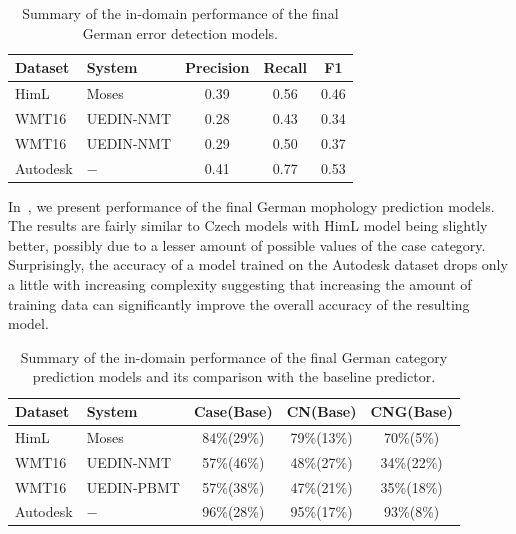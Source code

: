 \begin{table}[t]
\centering
\small

\begin{tabular}{ll|ccc}
Dataset  &  System  &  Precision  &  Recall  &  F1  \\
\hline
HimL  &  Moses  &  0.39  &  0.56  &  0.46  \\
WMT16 &  UEDIN-NMT  &  0.28  &  0.43  &  0.34  \\
WMT16 &  UEDIN-NMT  &  0.29  &  0.50  &  0.37  \\
Autodesk  &  $-$  &  0.41  &  0.77  &  0.53  \\
\end{tabular}
\caption[Model summary (German) - error detection]{
    Summary of the in-domain performance of the final German error detection models.
}
\label{wf_de-summary}
\end{table}

In~, we present performance of the final German
mophology prediction models. The results are fairly similar to Czech models with
HimL model being slightly better, possibly due to a lesser amount of possible values
of the case category. Surprisingly, the accuracy of  a model trained on the Autodesk
dataset drops only a little with increasing complexity suggesting that increasing
the amount of training data can significantly improve the overall accuracy of the
resulting model.

\begin{table}[t]
\centering
\small

\begin{tabular}{ll|ccc}
Dataset  &  System  &  Case(Base)  &  CN(Base)  & CNG(Base)  \\
\hline
HimL  &  Moses  &  84\%(29\%)  &  79\%(13\%)  &  70\%(5\%)  \\
WMT16  &  UEDIN-NMT  &  57\%(46\%)  &  48\%(27\%)  &  34\%(22\%)  \\
WMT16  &  UEDIN-PBMT  &  57\%(38\%)  &  47\%(21\%)  &  35\%(18\%)\\
Autodesk  &  $-$  &  96\%(28\%)  &  95\%(17\%)  &  93\%(8\%)  \\

\end{tabular}
\caption[Model summary (German) - morphological prediction]{
    Summary of the in-domain performance of the final German category prediction models
	and its comparison with the baseline predictor.
}
\label{cats_de-summary}
\end{table}

